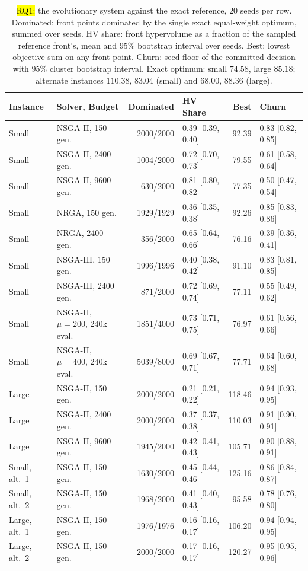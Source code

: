 \documentclass[systems,article,accept,moreauthors,pdftex]{Definitions/mdpi}
\begin{document}
\begin{table}[H]
\centering
\caption{\hl{RQ1:} %
 the evolutionary system against the exact reference, $20$ seeds per row.
Dominated: front points dominated by the single exact equal-weight optimum, summed over seeds. HV
share: front hypervolume as a fraction of the sampled reference front's, mean and 95\% bootstrap
interval over seeds. Best: lowest objective sum on any front point. Churn: seed floor of the
committed decision with 95\% cluster bootstrap interval. Exact optimum: small $74.58$, large
$85.18$; alternate instances $110.38$, $83.04$ (small) and $68.00$, $88.36$ (large).\label{tab:rq1}}
\footnotesize
\setlength{\tabcolsep}{4pt}
\begin{tabularx}{\textwidth}{llrlrl}
\toprule
\textbf{Instance} & \textbf{Solver, Budget} & \textbf{Dominated} & \textbf{HV Share} & \textbf{Best} & \textbf{Churn}\\
\midrule
Small & NSGA-II, 150 gen. & 2000/2000 & 0.39 [0.39, 0.40] & 92.39 & 0.83 [0.82, 0.85]\\
Small & NSGA-II, 2400 gen. & 1004/2000 & 0.72 [0.70, 0.73] & 79.55 & 0.61 [0.58, 0.64]\\
Small & NSGA-II, 9600 gen. & 630/2000 & 0.81 [0.80, 0.82] & 77.35 & 0.50 [0.47, 0.54]\\
Small & NRGA, 150 gen. & 1929/1929 & 0.36 [0.35, 0.38] & 92.26 & 0.85 [0.83, 0.86]\\
Small & NRGA, 2400 gen. & 356/2000 & 0.65 [0.64, 0.66] & 76.16 & 0.39 [0.36, 0.41]\\
Small & NSGA-III, 150 gen. & 1996/1996 & 0.40 [0.38, 0.42] & 91.10 & 0.83 [0.81, 0.85]\\
Small & NSGA-III, 2400 gen. & 871/2000 & 0.72 [0.69, 0.74] & 77.11 & 0.55 [0.49, 0.62]\\
Small & NSGA-II, $\mu=200$, 240k eval. & 1851/4000 & 0.73 [0.71, 0.75] & 76.97 & 0.61 [0.56, 0.66]\\
Small & NSGA-II, $\mu=400$, 240k eval. & 5039/8000 & 0.69 [0.67, 0.71] & 77.71 & 0.64 [0.60, 0.68]\\
Large & NSGA-II, 150 gen. & 2000/2000 & 0.21 [0.21, 0.22] & 118.46 & 0.94 [0.93, 0.95]\\
Large & NSGA-II, 2400 gen. & 2000/2000 & 0.37 [0.37, 0.38] & 110.03 & 0.91 [0.90, 0.91]\\
Large & NSGA-II, 9600 gen. & 1945/2000 & 0.42 [0.41, 0.43] & 105.71 & 0.90 [0.88, 0.91]\\
\midrule
Small, alt.\ 1 & NSGA-II, 150 gen. & 1630/2000 & 0.45 [0.44, 0.46] & 125.16 & 0.86 [0.84, 0.87]\\
Small, alt.\ 2 & NSGA-II, 150 gen. & 1968/2000 & 0.41 [0.40, 0.43] & 95.58 & 0.78 [0.76, 0.80]\\
Large, alt.\ 1 & NSGA-II, 150 gen. & 1976/1976 & 0.16 [0.16, 0.17] & 106.20 & 0.94 [0.94, 0.95]\\
Large, alt.\ 2 & NSGA-II, 150 gen. & 2000/2000 & 0.17 [0.16, 0.17] & 120.27 & 0.95 [0.95, 0.96]\\
\bottomrule
\end{tabularx}
\end{table}
\end{document}
